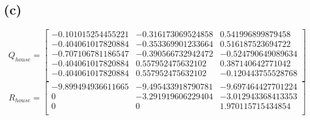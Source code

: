 \documentclass{article}
\begin{document}
        \subsection*{(c)}
            \begin{equation}
                Q_{house} = \left[
                \begin{array}{ccccc}
                    -0.101015254455221 & -0.316173069524858 &  0.541996899879458\\
                    -0.404061017820884 & -0.353369901233664 &  0.516187523694722\\
                    -0.707106781186547 & -0.390566732942472 & -0.524790649089634\\
                    -0.404061017820884 &  0.557952475632102 &  0.387140642771042\\
                    -0.404061017820884 &  0.557952475632102 & -0.120443755528768\\
                \end{array}
                \right]
            \end{equation}
            \begin{equation}
                R_{house} = \left[    
                \begin{array}{ccc}
                    -9.899494936611665 & -9.495433918790781 & -9.697464427701224\\
                    0 & -3.291919606229404 & -3.012943368413353\\
                    0 &                  0 &  1.970115715434854\\
                \end{array}
                \right]
            \end{equation}
\end{document}
